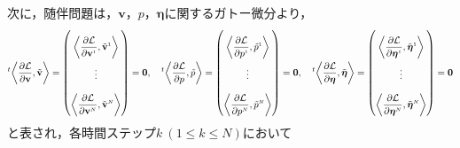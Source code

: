 \documentclass[a4paper,xelatex,ja=standard]{bxjsarticle}
\begin{document}
次に，随伴問題は，$\mathbf{v}$，$p$，$\boldsymbol{\eta}$に関するガトー微分より，
\begin{equation}
    \everymath{\displaystyle}
    \setlength{\arraycolsep}{0.5pt}
    \renewcommand{\arraystretch}{2.5}
    \label{eq:adjoint_problem}
    {}^{t}\!\left\langle\frac{\partial \mathcal{L}}{\partial \mathbf{v}}, \tilde{\mathbf{v}}\right\rangle
    = \begin{pmatrix}
        \left\langle\frac{\partial \mathcal{L}}{\partial \mathbf{v}^{\scriptscriptstyle 1}}, \tilde{\mathbf{v}}^{\scriptscriptstyle 1}\right\rangle \\
        \vdots \\
        \left\langle\frac{\partial \mathcal{L}}{\partial \mathbf{v}^{\scriptscriptstyle N}}, \tilde{\mathbf{v}}^{\scriptscriptstyle N}\right\rangle 
    \end{pmatrix}
    =\mathbf{0}
    ,\quad
    {}^{t}\!\left\langle\frac{\partial \mathcal{L}}{\partial p}, \tilde{p}\right\rangle
    = \begin{pmatrix}
        \left\langle\frac{\partial \mathcal{L}}{\partial p^{\scriptscriptstyle 1}}, \tilde{p}^{\scriptscriptstyle 1}\right\rangle \\
        \vdots \\
        \left\langle\frac{\partial \mathcal{L}}{\partial p^{\scriptscriptstyle N}}, \tilde{p}^{\scriptscriptstyle N}\right\rangle 
    \end{pmatrix}
    =\mathbf{0}
    ,\quad
    {}^{t}\!\left\langle\frac{\partial \mathcal{L}}{\partial \boldsymbol{\eta}}, \tilde{\boldsymbol{\eta}}\right\rangle
    = \begin{pmatrix}
        \left\langle\frac{\partial \mathcal{L}}{\partial \boldsymbol{\eta}^{\scriptscriptstyle 1}}, \tilde{\boldsymbol{\eta}}^{\scriptscriptstyle 1}\right\rangle \\
        \vdots \\
        \left\langle\frac{\partial \mathcal{L}}{\partial \boldsymbol{\eta}^{\scriptscriptstyle N}}, \tilde{\boldsymbol{\eta}}^{\scriptscriptstyle N}\right\rangle 
    \end{pmatrix}
    =\mathbf{0}
\end{equation}
と表され，各時間ステップ$k \ (1 \leq k \leq N)$において
\end{document}
